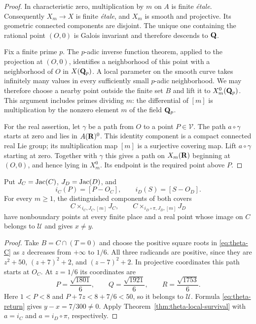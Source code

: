 \begin{proof}
In characteristic zero, multiplication by $m$ on $A$ is finite
\emph{\'etale}.  Consequently $X_m\to X$ is finite \emph{\'etale},
and $X_m$ is smooth and projective.  Its geometric connected components
are disjoint.  The unique one containing the rational point $(O,0)$ is
Galois invariant and therefore descends to $\mathbf Q$.

Fix a finite prime $p$.  The $p$-adic inverse function theorem, applied
to the projection at $(O,0)$, identifies a neighborhood of this point
with a neighborhood of $O$ in $X(\mathbf Q_p)$.  A local parameter on the smooth
curve takes infinitely many values in every sufficiently small
$p$-adic neighborhood.  We may therefore choose a nearby point outside
the finite set $B$ and lift it to $X_m^0(\mathbf Q_p)$.  This argument includes
primes dividing $m$: the differential of $[m]$ is multiplication by the
nonzero element $m$ of the field $\mathbf Q_p$.

For the real assertion, let $\gamma$ be a path from $O$ to a point
$P\in\mathcal V$.  The path $a\circ\gamma$ starts at zero and lies in
$A(\mathbf R)^0$.  This identity component is a compact connected real Lie
group; its multiplication map $[m]$ is a surjective covering map.
Lift $a\circ\gamma$ starting at zero.  Together with $\gamma$ this gives
a path on $X_m(\mathbf R)$ beginning at $(O,0)$, and hence lying in $X_m^0$.
Its endpoint is the required point above $P$.
\end{proof}

\begin{corollary}
\label{cor:theta-surviving-covers}
Put $J_C=\operatorname{Jac}(C)$, $J_D=\operatorname{Jac}(D)$, and
\[
 i_C(P)=[P-O_C],\qquad i_D(S)=[S-O_D].
\]
For every $m\ge1$, the distinguished components of both covers
\begin{equation}
 C\times_{i_C,J_C,[m]}J_C,
 \qquad
 C\times_{i_D\circ\pi,J_D,[m]}J_D
 \label{eq:theta-surviving-covers}
\end{equation}
have nonboundary points at every finite place and a real point whose
image on $C$ belongs to $\mathcal U$ and gives $x\ne y$.
\end{corollary}

\begin{proof}
Take $B=C\cap(T=0)$ and choose the positive square roots in
\eqref{eq:theta-C} as $z$ decreases from $+\infty$ to $1/6$.
All three radicands are positive, since they are
$z^2+50$, $(z+7)^2+2$, and $(z-7)^2+2$.
In projective coordinates this path starts at $O_C$.  At $z=1/6$ its
coordinates are
\[
 P=\frac{\sqrt{1801}}6,\qquad
 Q=\frac{\sqrt{1921}}6,\qquad
 R=\frac{\sqrt{1753}}6.
\]
Here $1<P<8$ and $P+7z<8+7/6<50$, so it belongs to $\mathcal U$.
Formula \eqref{eq:theta-return} gives $y-x=7/300\ne0$.
Apply Theorem~\ref{thm:theta-local-survival} with $a=i_C$ and
$a=i_D\circ\pi$, respectively.
\end{proof}

